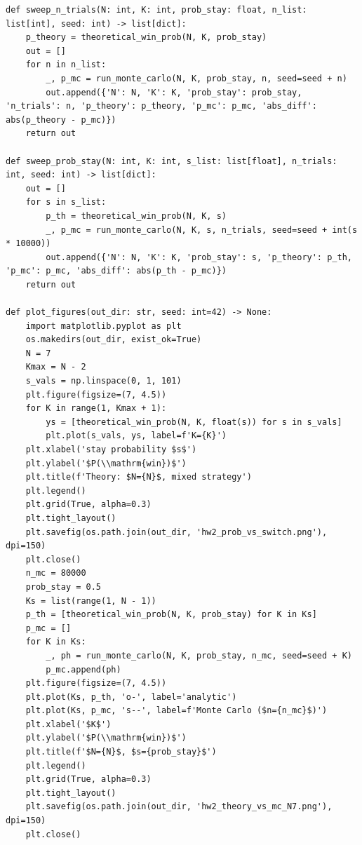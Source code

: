 \documentclass[a4paper, 14pt]{extarticle}
\begin{document}
\begin{longlisting}
\begin{verbatim}
def sweep_n_trials(N: int, K: int, prob_stay: float, n_list: list[int], seed: int) -> list[dict]:
    p_theory = theoretical_win_prob(N, K, prob_stay)
    out = []
    for n in n_list:
        _, p_mc = run_monte_carlo(N, K, prob_stay, n, seed=seed + n)
        out.append({'N': N, 'K': K, 'prob_stay': prob_stay, 'n_trials': n, 'p_theory': p_theory, 'p_mc': p_mc, 'abs_diff': abs(p_theory - p_mc)})
    return out

def sweep_prob_stay(N: int, K: int, s_list: list[float], n_trials: int, seed: int) -> list[dict]:
    out = []
    for s in s_list:
        p_th = theoretical_win_prob(N, K, s)
        _, p_mc = run_monte_carlo(N, K, s, n_trials, seed=seed + int(s * 10000))
        out.append({'N': N, 'K': K, 'prob_stay': s, 'p_theory': p_th, 'p_mc': p_mc, 'abs_diff': abs(p_th - p_mc)})
    return out

def plot_figures(out_dir: str, seed: int=42) -> None:
    import matplotlib.pyplot as plt
    os.makedirs(out_dir, exist_ok=True)
    N = 7
    Kmax = N - 2
    s_vals = np.linspace(0, 1, 101)
    plt.figure(figsize=(7, 4.5))
    for K in range(1, Kmax + 1):
        ys = [theoretical_win_prob(N, K, float(s)) for s in s_vals]
        plt.plot(s_vals, ys, label=f'K={K}')
    plt.xlabel('stay probability $s$')
    plt.ylabel('$P(\\mathrm{win})$')
    plt.title(f'Theory: $N={N}$, mixed strategy')
    plt.legend()
    plt.grid(True, alpha=0.3)
    plt.tight_layout()
    plt.savefig(os.path.join(out_dir, 'hw2_prob_vs_switch.png'), dpi=150)
    plt.close()
    n_mc = 80000
    prob_stay = 0.5
    Ks = list(range(1, N - 1))
    p_th = [theoretical_win_prob(N, K, prob_stay) for K in Ks]
    p_mc = []
    for K in Ks:
        _, ph = run_monte_carlo(N, K, prob_stay, n_mc, seed=seed + K)
        p_mc.append(ph)
    plt.figure(figsize=(7, 4.5))
    plt.plot(Ks, p_th, 'o-', label='analytic')
    plt.plot(Ks, p_mc, 's--', label=f'Monte Carlo ($n={n_mc}$)')
    plt.xlabel('$K$')
    plt.ylabel('$P(\\mathrm{win})$')
    plt.title(f'$N={N}$, $s={prob_stay}$')
    plt.legend()
    plt.grid(True, alpha=0.3)
    plt.tight_layout()
    plt.savefig(os.path.join(out_dir, 'hw2_theory_vs_mc_N7.png'), dpi=150)
    plt.close()


\end{verbatim}
\end{longlisting}
\end{document}
